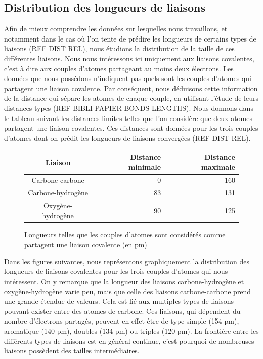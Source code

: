 \subsection{Distribution des longueurs de liaisons}

\par Afin de mieux comprendre les données sur lesquelles nous travaillons, et notamment dans le cas où l'on tente de prédire les longueurs de certains types de liaisons (REF DIST REL), nous étudions la distribution de la taille de ces différentes liaisons. Nous nous intéressons ici uniquement aux liaisons covalentes, c'est à dire aux couples d'atomes partageant au moins deux électrons. Les données que nous possédons n'indiquent pas quels sont les couples d'atomes qui partagent une liaison covalente. Par conséquent, nous déduisons cette information de la distance qui sépare les atomes de chaque couple, en utilisant l'étude de leurs distances types (REF BIBLI PAPIER BONDS LENGTHS). Nous donnons dans le tableau suivant les distances limites telles que l'on considère que deux atomes partagent une liaison covalentes. Ces distances sont données pour les trois couples d'atomes dont on prédit les longueurs de liaisons convergées (REF DIST REL).

\begin{figure}[!h]
	\centering
	\begin{tabular}{|c|r|r|}
		\hline
		\textbf{Liaison} & \textbf{Distance minimale} & \textbf{Distance maximale} \\ \hline
		Carbone-carbone & 0 & 160 \\ \hline
		Carbone-hydrogène & 83 & 131 \\ \hline
		Oxygène-hydrogène & 90 & 125 \\ \hline
	\end{tabular}
	
	\caption{Longueurs telles que les couples d'atomes sont considérés comme partagent une liaison covalente (en pm)}
\end{figure}

\par Dans les figures suivantes, nous représentons graphiquement la distribution des longueurs de liaisons covalentes pour les trois couples d'atomes qui nous intéressent. On y remarque que la longueur des liaisons carbone-hydrogène et oxygène-hydrogène varie peu, mais que celle des liaisons carbone-carbone prend une grande étendue de valeurs. Cela est lié aux multiples types de liaisons pouvant exister entre des atomes de carbone. Ces liaisons, qui dépendent du nombre d'électrons partagés, peuvent en effet être de type simple (154 pm), aromatique (140 pm), doubles (134 pm) ou triples (120 pm). La frontière entre les différents types de liaisons est en général continue, c'est pourquoi de nombreuses liaisons possèdent des tailles intermédiaires.

